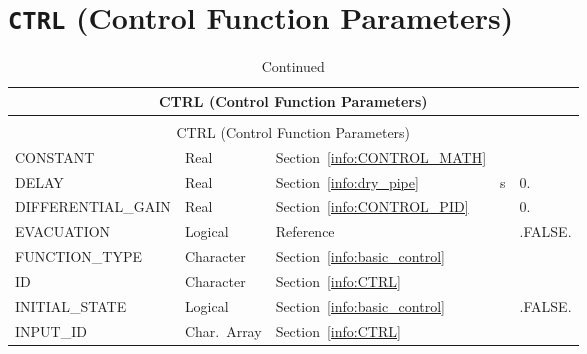 \documentclass[11pt]{book}
\begin{document}
\vspace{\baselineskip}



\section{\texorpdfstring{{\tt CTRL}}{CTRL} (Control Function Parameters)}

\begin{longtable}{@{\extracolsep{\fill}}|l|l|l|l|l|}
\caption[Control function parameters ({\ct CTRL} namelist group)]{For more information see Section~\ref{info:CTRL}.}
\label{tbl:CTRL} \\
\hline
\multicolumn{5}{|c|}{{\ct CTRL} (Control Function Parameters)} \\
\hline \hline
\endfirsthead
\caption[]{Continued} \\
\hline
\multicolumn{5}{|c|}{{\ct CTRL} (Control Function Parameters)} \\
\hline \hline
\endhead
{\ct CONSTANT}            & Real       & Section~\ref{info:CONTROL_MATH}         &    &                        \\ \hline
{\ct DELAY}              & Real        & Section~\ref{info:dry_pipe}             & s  &  0.                    \\ \hline
{\ct DIFFERENTIAL\_GAIN} & Real        & Section~\ref{info:CONTROL_PID}          &    &  0.                    \\ \hline
{\ct EVACUATION}         & Logical     & Reference~\cite{FDS_Evac_Users_Guide}   &    & {\ct .FALSE.}          \\ \hline
{\ct FUNCTION\_TYPE}     & Character   & Section~\ref{info:basic_control}        &    &                        \\ \hline
{\ct ID}                 & Character   & Section~\ref{info:CTRL}                 &    &                        \\ \hline
{\ct INITIAL\_STATE}     & Logical     & Section~\ref{info:basic_control}        &    & {\ct .FALSE.}          \\ \hline
{\ct INPUT\_ID}          & Char.~Array & Section~\ref{info:CTRL}                 &    &                        \\ \hline

\end{longtable}
\end{document}
